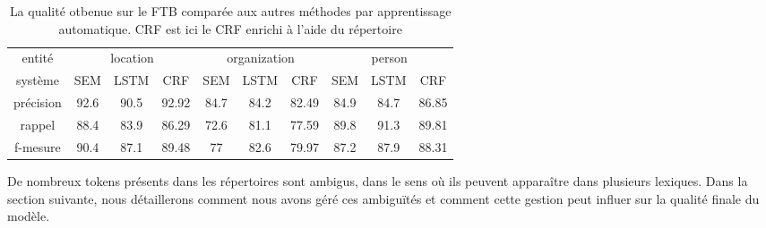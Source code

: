 \documentclass[citation\_needed]{subfiles}
\begin{document}
\begin{table}[ht!]
\centering
\small
\begin{tabular}{|c|ccc|ccc|ccc|}
\hline
entité                  & \multicolumn{3}{c|}{location} & \multicolumn{3}{c|}{organization} & \multicolumn{3}{c|}{person} \\
système                 & SEM  & LSTM & CRF             & SEM  & LSTM & CRF                 & SEM  & LSTM & CRF \\
\hline
précision               & 92.6 & 90.5 & 92.92           & 84.7 & 84.2 & 82.49               & 84.9 & 84.7 & 86.85 \\
rappel                  & 88.4 & 83.9 & 86.29           & 72.6 & 81.1 & 77.59               & 89.8 & 91.3 & 89.81 \\
f-mesure                & 90.4 & 87.1 & 89.48           & 77   & 82.6 & 79.97               & 87.2 & 87.9 & 88.31 \\
\hline
\end{tabular}
\caption{La qualité otbenue sur le FTB comparée aux autres méthodes par apprentissage automatique. CRF est ici le CRF enrichi à l'aide du répertoire}
\label{tab:ftb6-directory-vs-NN}
\end{table}

De nombreux tokens présents dans les répertoires sont ambigus, dans le sens où ils peuvent apparaître dans plusieurs lexiques. Dans la section suivante, nous détaillerons comment nous avons géré ces ambiguïtés et comment cette gestion peut influer sur la qualité finale du modèle.
\end{document}
